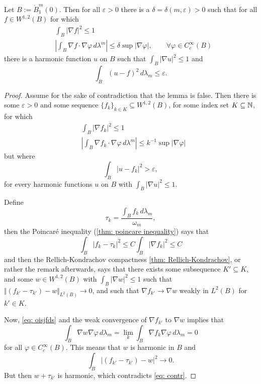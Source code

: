 \begin{lemma}\label{lem: harmonic approximation}
Let $B:=\mathring{B}_1^m(0)$. Then for all $\varepsilon > 0$ there is a $\delta = \delta(m, \varepsilon) > 0$ such that for all $f \in W^{1,2}(B)$ for which
\begin{align*}
    &\int_B |\nabla f|^2 \le 1\\
    &\left| \int_B \nabla f \cdot \nabla \varphi \, d\lambda^m \right| \le \delta \sup|\nabla \varphi|, \qquad \forall \varphi \in C_c^{\infty}(B)
\end{align*}
there is a harmonic function $u$ on $B$ such that $\int_B |\nabla u|^2 \le 1$ and
\[
    \int_B (u-f)^2 \, d\lambda_m \le \varepsilon.
\]
\end{lemma}
\begin{proof}
Assume for the sake of contradiction that the lemma is false. Then there is some $\varepsilon > 0$ and some sequence $\{f_k\}_{k \in K} \subseteq W^{1,2}(B)$, for some index set $K \subseteq \mathbb{N}$, for which 
\begin{align}
    &\int_B |\nabla f_k|^2 \le 1 \\
    &\left| \int_B \nabla f_k \cdot \nabla \varphi \, d\lambda^m \right| \le k^{-1} \sup|\nabla \varphi|\label{eq: oisjfds}
\end{align}
but where
\begin{equation}
    \int_B |u - f_k|^2 > \varepsilon,\label{eq: contr}
\end{equation}
for every harmonic functions $u$ on $B$ with $\int_B |\nabla u|^2 \le 1$.

Define
\[
    \tau_k = \frac{\int_B f_k\, d\lambda_m}{\omega_m},
\]
then the Poincaré inequality (\cref{thm: poincare inequality}) says that
\[
    \int_B |f_k - \tau_k|^2 \le C \int_B |\nabla f_k|^2 \le C
\]
and then the Rellich-Kondrachov compactness \cref{thm: Rellich-Kondrachov}, or rather the remark afterwards, says that there exists some subsequence $K' \subseteq K$, and some $w \in W^{1,2}(B)$ with $\int_B |\nabla w|^2 \le 1$ such that $\Vert (f_{k'}-\tau_{k'}) - w\Vert_{L^2(B)} \to 0$, and such that $\nabla f_{k'} \to \nabla w$ weakly in $L^2(B)$ for $k' \in K$.

Now, \eqref{eq: oisjfds} and the weak convergence of $\nabla f_{k'}$ to $\nabla w$ implies that
\[
    \int_B \nabla w \nabla\varphi\,d\lambda_m = \lim_k \int_B \nabla f_k \nabla\varphi\, d\lambda_m = 0
\]
for all $\varphi \in C_c^{\infty}(B)$. This means that $w$ is harmonic in $B$ and
\[
    \int_B |(f_{k'} - \tau_{k'}) - w|^2 \to 0.
\]
But then $w+\tau_{k'}$ is harmonic, which contradicts \eqref{eq: contr}.
\end{proof}

